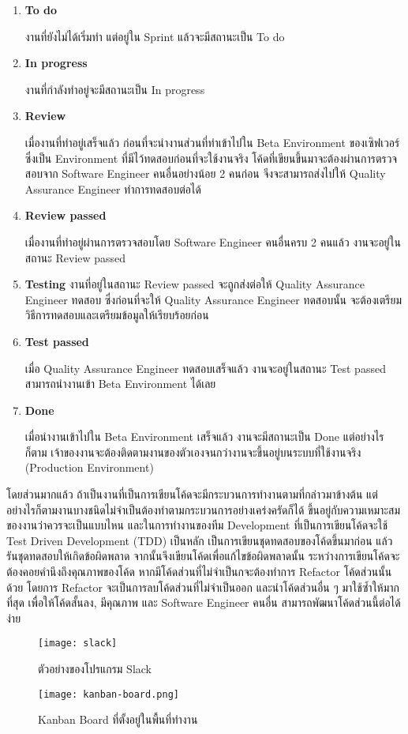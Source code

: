 \begin{enumerate}
	\item \textbf{To do}
	
	งานที่ยังไม่ได้เริ่มทำ แต่อยู่ใน Sprint แล้วจะมีสถานะเป็น To do
	
	\item \textbf{In progress}
	
	งานที่กำลังทำอยู่จะมีสถานะเป็น In progress
	
	\item \textbf{Review}
	
	เมื่องานที่ทำอยู่เสร็จแล้ว ก่อนที่จะนำงานส่วนที่ทำเข้าไปใน Beta Environment ของเซิฟเวอร์ ซึ่งเป็น Environment ที่มีไว้ทดสอบก่อนที่จะใช้งานจริง โค้ดที่เขียนขึ้นมาจะต้องผ่านการตรวจสอบจาก Software Engineer คนอื่นอย่างน้อย 2 คนก่อน จึงจะสามารถส่งไปให้ Quality Assurance Engineer ทำการทดสอบต่อได้
	
	\item \textbf{Review passed}
	
	เมื่องานที่ทำอยู่ผ่านการตรวจสอบโดย Software Engineer คนอื่นครบ 2 คนแล้ว งานจะอยู่ในสถานะ Review passed 
	
	\item \textbf{Testing}
	งานที่อยู่ในสถานะ Review passed จะถูกส่งต่อให้ Quality Assurance Engineer ทดสอบ ซึ่งก่อนที่จะให้ Quality Assurance Engineer ทดสอบนั้น จะต้องเตรียมวิธีการทดสอบและเตรียมข้อมูลให้เรียบร้อยก่อน
	
	\item \textbf{Test passed}
	
	เมื่อ Quality Assurance Engineer ทดสอบเสร็จแล้ว งานจะอยู่ในสถานะ Test passed สามารถนำงานเข้า Beta Environment ได้เลย
	
	\item \textbf{Done}
	
	เมื่อนำงานเข้าไปใน Beta Environment เสร็จแล้ว งานจะมีสถานะเป็น Done แต่อย่างไรก็ตาม เจ้าของงานจะต้องติดตามงานของตัวเองจนกว่างานจะขึ้นอยู่บนระบบที่ใช้งานจริง (Production Environment)
\end{enumerate}

โดยส่วนมากแล้ว ถ้าเป็นงานที่เป็นการเขียนโค้ดจะมีกระบวนการทำงานตามที่กล่าวมาข้างต้น แต่อย่างไรก็ตามงานบางชนิดไม่จำเป็นต้องทำตามกระบวนการอย่างเคร่งครัดก็ได้ ขึ้นอยู่กับความเหมาะสมของงานว่าควรจะเป็นแบบไหน และในการทำงานของทีม Development ที่เป็นการเขียนโค้ดจะใช้ Test Driven Development (TDD) เป็นหลัก เป็นการเขียนชุดทดสอบของโค้ดขึ้นมาก่อน แล้วรันชุดทดสอบให้เกิดข้อผิดพลาด จากนั้นจึงเขียนโค้ดเพื่อแก้ไขข้อผิดพลาดนั้น ระหว่างการเขียนโค้ดจะต้องคอยคำนึงถึงคุณภาพของโค้ด หากมีโค้ดส่วนที่ไม่จำเป็นกจะต้องทำการ Refactor โค้ดส่วนนั้นด้วย โดยการ Refactor จะเป็นการลบโค้ดส่วนที่ไม่จำเป็นออก และนำโค้ดส่วนอื่น ๆ มาใช้ซ้ำให้มากที่สุด เพื่อให้โค้ดสั้นลง, มีคุณภาพ และ Software Engineer คนอื่น สามารถพัฒนาโค้ดส่วนนี้ต่อได้ง่าย

\begin{figure}[!h]
	\centering
	\texttt{[image: slack]}  
	\caption{ตัวอย่างของโปรแกรม Slack}
	\label{Fig:slack}
\end{figure}

\begin{figure}[!h]
	\centering
	\texttt{[image: kanban-board.png]}  
	\caption{Kanban Board ที่ตั้งอยู่ในพื้นที่ทำงาน}
	\label{Fig:kanban-board}
\end{figure}